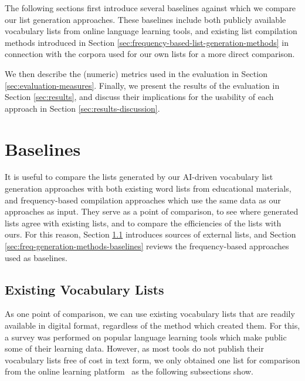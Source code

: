 The following sections first introduce several baselines against which we compare our list generation approaches.
These baselines include both publicly available vocabulary lists from online language learning tools, and existing list compilation methods introduced in Section \ref{sec:frequency-based-list-generation-methods} in connection with the corpora used for our own lists for a more direct comparison.

We then describe the (numeric) metrics used in the evaluation in Section \ref{sec:evaluation-measures}.
Finally, we present the results of the evaluation in Section \ref{sec:results}, and discuss their implications for the usability of each approach in Section \ref{sec:results-discussion}.

\section{Baselines}
It is useful to compare the lists generated by our AI-driven vocabulary list generation approaches with both existing word lists from educational materials, and frequency-based compilation approaches which use the same data as our approaches as input.
They serve as a point of comparison, to see where generated lists agree with existing lists, and to compare the efficiencies of the lists with ours.
For this reason, Section \ref{sec:exising-lists} introduces sources of external lists, and Section \ref{sec:freq-generation-methods-baselines} reviews the frequency-based approaches used as baselines.

\subsection{Existing Vocabulary Lists} \label{sec:exising-lists}
As one point of comparison, we can use existing vocabulary lists that are readily available in digital format, regardless of the method which created them.
For this, a survey was performed on popular language learning tools which make public some of their learning data.
However, as most tools do not publish their vocabulary lists free of cost in text form, we only obtained one list for comparison from the online learning platform \Rosetta\, as the following subsections show.

